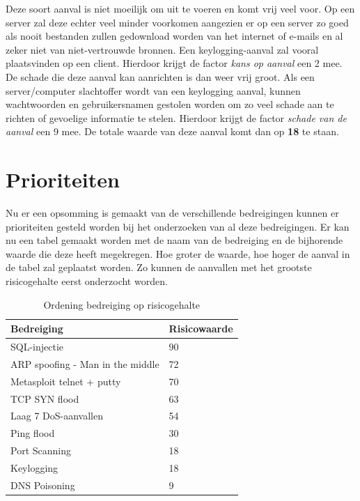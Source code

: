\documentclass[pdftex,a4paper,12pt]{report}
\begin{document}
Deze soort aanval is niet moeilijk om uit te voeren en komt vrij veel voor. Op een server zal deze echter veel minder voorkomen aangezien er op een server zo goed als nooit bestanden zullen gedownload worden van het internet of e-mails en al zeker niet van niet-vertrouwde bronnen. Een keylogging-aanval zal vooral plaatsvinden op een client. Hierdoor krijgt de factor \textit{kans op aanval} een 2 mee. De schade die deze aanval kan aanrichten is dan weer vrij groot. Als een server/computer slachtoffer wordt van een keylogging aanval, kunnen wachtwoorden en gebruikersnamen gestolen worden om zo veel schade aan te richten of gevoelige informatie te stelen. Hierdoor krijgt de factor \textit{schade van de aanval} een 9 mee. De totale waarde van deze aanval komt dan op \textbf{18} te staan.

\section{Prioriteiten}
Nu er een opsomming is gemaakt van de verschillende bedreigingen kunnen er prioriteiten gesteld worden bij het onderzoeken van al deze bedreigingen. Er kan nu een tabel gemaakt worden met de naam van de bedreiging en de bijhorende waarde die deze heeft megekregen. Hoe groter de waarde, hoe hoger de aanval in de tabel zal geplaatst worden. Zo kunnen de aanvallen met het grootste risicogehalte eerst onderzocht worden.

\begin{table}[h]
\centering
\begin{tabular}{|l|l|}
\hline
\textbf{Bedreiging}              & \textbf{Risicowaarde} \\ \hline
SQL-injectie                     & 90                    \\ \hline
ARP spoofing - Man in the middle & 72                    \\ \hline
Metasploit telnet + putty        & 70                    \\ \hline
TCP SYN flood                    & 63                    \\ \hline
Laag 7 DoS-aanvallen             & 54                    \\ \hline
Ping flood                       & 30                    \\ \hline
Port Scanning                    & 18                    \\ \hline
Keylogging                       & 18                    \\ \hline
DNS Poisoning                    & 9                     \\ \hline
\end{tabular}
\caption{Ordening bedreiging op risicogehalte}
\label{RisicoTabel}
\end{table}
\end{document}
